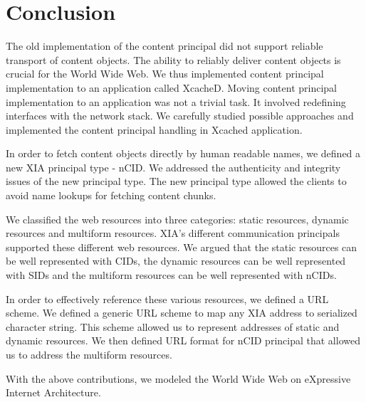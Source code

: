 \chapter{Conclusion}
\label{sec:conclusion}

The old implementation of the content principal did not support
reliable transport of content objects. The ability to reliably deliver
content objects is crucial for the World Wide Web. We thus implemented
content principal implementation to an application called
XcacheD. Moving content principal implementation to an application was
not a trivial task. It involved redefining interfaces with the network
stack. We carefully studied possible approaches and implemented the
content principal handling in Xcached application.

In order to fetch content objects directly by human readable names, we
defined a new XIA principal type - nCID. We addressed the authenticity
and integrity issues of the new principal type. The new principal type
allowed the clients to avoid name lookups for fetching content chunks.

We classified the web resources into three categories: static
resources, dynamic resources and multiform resources. XIA's different
communication principals supported these different web resources. We
argued that the static resources can be well represented with CIDs,
the dynamic resources can be well represented with SIDs and the
multiform resources can be well represented with nCIDs.

In order to effectively reference these various resources, we defined
a URL scheme. We defined a generic URL scheme to map any XIA address
to serialized character string. This scheme allowed us to represent
addresses of static and dynamic resources. We then defined URL format
for nCID principal that allowed us to address the multiform resources.

With the above contributions, we modeled the World Wide Web on
eXpressive Internet Architecture.
